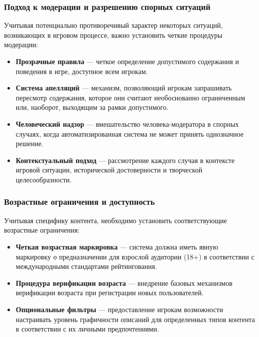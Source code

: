 \subsubsection{Подход к модерации и разрешению спорных ситуаций}

Учитывая потенциально противоречивый характер некоторых ситуаций, возникающих в игровом процессе, важно установить четкие процедуры модерации:

\begin{itemize}
    \item \textbf{Прозрачные правила} — четкое определение допустимого содержания и поведения в игре, доступное всем игрокам.

    \item \textbf{Система апелляций} — механизм, позволяющий игрокам запрашивать пересмотр содержания, которое они считают необоснованно ограниченным или, наоборот, выходящим за рамки допустимого.

    \item \textbf{Человеческий надзор} — вмешательство человека-модератора в спорных случаях, когда автоматизированная система не может принять однозначное решение.

    \item \textbf{Контекстуальный подход} — рассмотрение каждого случая в контексте игровой ситуации, исторической достоверности и творческой целесообразности.
\end{itemize}

\subsubsection{Возрастные ограничения и доступность}

Учитывая специфику контента, необходимо установить соответствующие возрастные ограничения:

\begin{itemize}
    \item \textbf{Четкая возрастная маркировка} — система должна иметь явную маркировку о предназначении для взрослой аудитории (18+) в соответствии с международными стандартами рейтингования.

    \item \textbf{Процедура верификации возраста} — внедрение базовых механизмов верификации возраста при регистрации новых пользователей.

    \item \textbf{Опциональные фильтры} — предоставление игрокам возможности настраивать уровень графичности описаний для определенных типов контента в соответствии с их личными предпочтениями.
\end{itemize}

